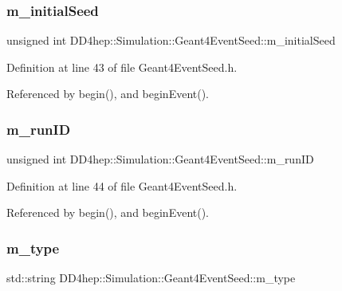 \subsubsection{\texorpdfstring{m\+\_\+initial\+Seed}{m\_initialSeed}}
{\footnotesize\ttfamily unsigned int D\+D4hep\+::\+Simulation\+::\+Geant4\+Event\+Seed\+::m\+\_\+initial\+Seed\hspace{0.3cm}{\ttfamily [protected]}}



Definition at line 43 of file Geant4\+Event\+Seed.\+h.



Referenced by begin(), and begin\+Event().

\hypertarget{class_d_d4hep_1_1_simulation_1_1_geant4_event_seed_a0810bca4809cd7a1293ed324cb427daa}{}\label{class_d_d4hep_1_1_simulation_1_1_geant4_event_seed_a0810bca4809cd7a1293ed324cb427daa} 
\subsubsection{\texorpdfstring{m\+\_\+run\+ID}{m\_runID}}
{\footnotesize\ttfamily unsigned int D\+D4hep\+::\+Simulation\+::\+Geant4\+Event\+Seed\+::m\+\_\+run\+ID\hspace{0.3cm}{\ttfamily [protected]}}



Definition at line 44 of file Geant4\+Event\+Seed.\+h.



Referenced by begin(), and begin\+Event().

\hypertarget{class_d_d4hep_1_1_simulation_1_1_geant4_event_seed_ae04ac0bb4801305fa677c4f4bce1a1ea}{}\label{class_d_d4hep_1_1_simulation_1_1_geant4_event_seed_ae04ac0bb4801305fa677c4f4bce1a1ea} 
\subsubsection{\texorpdfstring{m\+\_\+type}{m\_type}}
{\footnotesize\ttfamily std\+::string D\+D4hep\+::\+Simulation\+::\+Geant4\+Event\+Seed\+::m\+\_\+type\hspace{0.3cm}{\ttfamily [protected]}}



